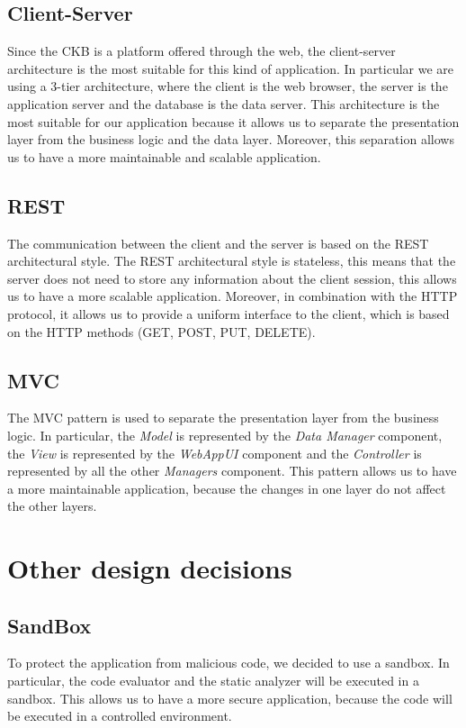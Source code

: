 \subsection{Client-Server}
Since the CKB is a platform offered through the web, the client-server architecture is the most suitable for this kind of application. In particular we are using a 3-tier architecture, where the client is the web browser, the server is the application server and the database is the data server. This architecture is the most suitable for our application because it allows us to separate the presentation layer from the business logic and the data layer. Moreover, this separation allows us to have a more maintainable and scalable application.

\subsection{REST}
The communication between the client and the server is based on the REST architectural style. The REST architectural style is stateless, this means that the server does not need to store any information about the client session, this allows us to have a more scalable application. Moreover, in combination with the HTTP protocol, it allows us to provide a uniform interface to the client, which is based on the HTTP methods (GET, POST, PUT, DELETE).

\subsection{MVC}
The MVC pattern is used to separate the presentation layer from the business logic. In particular, the \textit{Model} is represented by the \textit{Data Manager} component, the \textit{View} is represented by the \textit{WebAppUI} component and the \textit{Controller} is represented by all the other \textit{Managers} component. This pattern allows us to have a more maintainable application, because the changes in one layer do not affect the other layers.


\section{Other design decisions}
\label{s:other-design-decisions}%

\subsection{SandBox}
To protect the application from malicious code, we decided to use a sandbox. In particular, the code evaluator and the static analyzer will be executed in a sandbox. This allows us to have a more secure application, because the code will be executed in a controlled environment.


